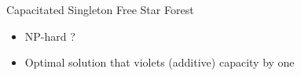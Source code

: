 \begin{frame}{Capacitated Singleton Free Star Forest}
\pause
\begin{itemize}[<+->]
  \item NP-hard ?
  \item Optimal solution that violets (additive) capacity by one
\end{itemize}
\end{frame}